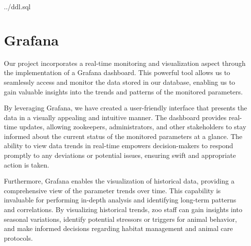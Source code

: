 \documentclass[parskip=full]{report}
\begin{document}

{../ddl.sql}

\section{Grafana}

Our project incorporates a real-time monitoring and visualization aspect through the implementation of a Grafana dashboard. This powerful tool allows us to seamlessly access and monitor the data stored in our database, enabling us to gain valuable insights into the trends and patterns of the monitored parameters.

By leveraging Grafana, we have created a user-friendly interface that presents the data in a visually appealing and intuitive manner. The dashboard provides real-time updates, allowing zookeepers, administrators, and other stakeholders to stay informed about the current status of the monitored parameters at a glance. The ability to view data trends in real-time empowers decision-makers to respond promptly to any deviations or potential issues, ensuring swift and appropriate action is taken.

Furthermore, Grafana enables the visualization of historical data, providing a comprehensive view of the parameter trends over time. This capability is invaluable for performing in-depth analysis and identifying long-term patterns and correlations. By visualizing historical trends, zoo staff can gain insights into seasonal variations, identify potential stressors or triggers for animal behavior, and make informed decisions regarding habitat management and animal care protocols.
\end{document}
